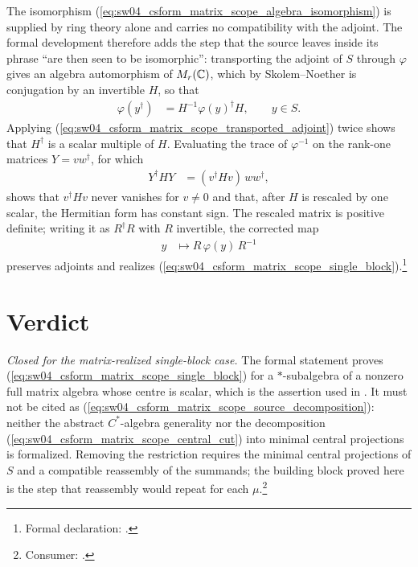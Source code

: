 \documentclass{article}
\begin{document}
The isomorphism (\ref{eq:sw04_csform_matrix_scope_algebra_isomorphism}) is
supplied by ring theory alone and carries no compatibility with the adjoint.
The formal development therefore adds the step that the source leaves inside
its phrase ``are then seen to be isomorphic'': transporting the adjoint of $S$
through $\varphi$ gives an algebra automorphism of $M_{r}(\mathbb{C})$, which by
Skolem--Noether is conjugation by an invertible $H$, so that
\begin{align}
    \varphi(y^\dagger)
        &=H^{-1}\varphi(y)^\dagger H,
        \qquad y\in S.
    \label{eq:sw04_csform_matrix_scope_transported_adjoint}
\end{align}
Applying (\ref{eq:sw04_csform_matrix_scope_transported_adjoint}) twice shows
that $H^\dagger$ is a scalar multiple of $H$. Evaluating the trace of
$\varphi^{-1}$ on the rank-one matrices $Y=vw^\dagger$, for which
\begin{align}
    Y^\dagger HY
        &=(v^\dagger Hv)\,ww^\dagger,
    \label{eq:sw04_csform_matrix_scope_rank_one_sandwich}
\end{align}
shows that $v^\dagger Hv$ never vanishes for $v\neq 0$ and that, after $H$ is
rescaled by one scalar, the Hermitian form has constant sign. The rescaled
matrix is positive definite; writing it as $R^\dagger R$ with $R$ invertible,
the corrected map
\begin{align}
    y
        &\longmapsto R\,\varphi(y)\,R^{-1}
    \label{eq:sw04_csform_matrix_scope_corrected_isomorphism}
\end{align}
preserves adjoints and realizes
(\ref{eq:sw04_csform_matrix_scope_single_block}).\footnote{Formal declaration:
.}

\section{Verdict}

\emph{Closed for the matrix-realized single-block case.} The formal statement
proves (\ref{eq:sw04_csform_matrix_scope_single_block}) for a $*$-subalgebra of
a nonzero full matrix algebra whose centre is scalar, which is the assertion
used in \cite[lines~1278--1282]{GrossNesmeVogtsWerner2012}. It must not be
cited as (\ref{eq:sw04_csform_matrix_scope_source_decomposition}): neither the
abstract $C^\ast$-algebra generality nor the decomposition
(\ref{eq:sw04_csform_matrix_scope_central_cut}) into minimal central
projections is formalized. Removing the restriction requires the minimal
central projections of $S$ and a compatible reassembly of the summands; the
building block proved here is the step that reassembly would repeat for each
$\mu$.\footnote{Consumer: .}



\end{document}
